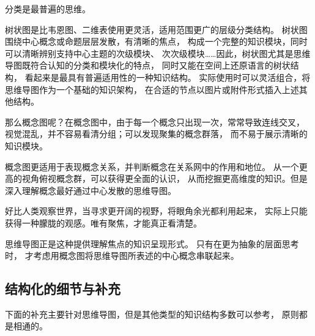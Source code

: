 \documentclass[../main.tex]{subfiles}
\begin{document}
分类是最普遍的思维。

树状图是比韦恩图、二维表使用更灵活，适用范围更广的层级分类结构。
树状图围绕中心概念或命题层层发散，有清晰的焦点，
构成一个完整的知识模块，同时可以清晰辨别支持中心主题的次级模块、
次次级模块……因此，树状图尤其是思维导图既符合认知的分类和模块化的特点，
同时又能在空间上还原语言的树状结构，
看起来是最具有普遍适用性的一种知识结构。
实际使用时可以灵活组合，将思维导图作为一个基础的知识架构，
在合适的节点以图片或附件形式插入上述其他结构。

那么概念图呢？在概念图中，由于每一个概念只出现一次，常常导致连线交叉，
视觉混乱，并不容易看清分组；可以发现聚集的概念群落，
而不易于展示清晰的知识模块。

概念图更适用于表现概念关系，并判断概念在关系网中的作用和地位。
从一个更高的视角俯视概念群，可以获得更全面的认识，
从而挖掘更高维度的知识。但是深入理解概念最好通过中心发散的思维导图。

好比人类观察世界，当寻求更开阔的视野，将眼角余光都利用起来，
实际上只能获得一种朦胧的观感。唯有聚焦，才能真正看清楚。

思维导图正是这种提供理解焦点的知识呈现形式。
只有在更为抽象的层面思考时，
才考虑用概念图将思维导图所表述的中心概念串联起来。
%
\subsection{结构化的细节与补充}
下面的补充主要针对思维导图，但是其他类型的知识结构多数可以参考，
原则都是相通的。
\\

\begin{cuenotes}
\end{cuenotes}
\end{document}
